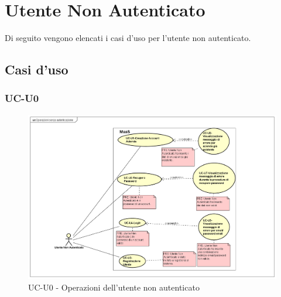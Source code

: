 \section{Utente Non Autenticato}

Di seguito vengono elencati i casi d'uso per l'utente non autenticato.

\subsection{Casi d'uso}

\subsubsection{UC-U0}

    \begin{figure}[H]
      \begin{center}
        \includegraphics[width=12cm]{res/img/UCUtenti/UCUtenteNA/UC-U0-OperazioniSenzaAutenticazione_0}
      \caption{UC-U0 - Operazioni dell'utente non autenticato}
      \end{center} 
    \end{figure}    
    

